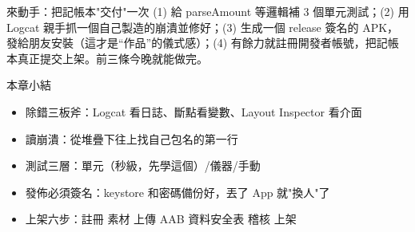 \begin{tcbpractice}{來動手：把記帳本"交付"一次}
(1) 給 parseAmount 等邏輯補 3 個單元測試；(2) 用 Logcat 親手抓一個自己製造的崩潰並修好；(3) 生成一個 release 簽名的 APK，發給朋友安裝（這才是“作品”的儀式感）；(4) 有餘力就註冊開發者帳號，把記帳本真正提交上架。前三條今晚就能做完。

\end{tcbpractice}

\begin{tcbsummary}{本章小結}
\begin{itemize}
  \item 除錯三板斧：Logcat 看日誌、斷點看變數、Layout Inspector 看介面
  \item 讀崩潰：從堆疊下往上找自己包名的第一行
  \item 測試三層：單元（秒級，先學這個）/儀器/手動
  \item 發佈必須簽名：keystore 和密碼備份好，丟了 App 就"換人"了
  \item 上架六步：註冊 素材 上傳 AAB 資料安全表 稽核 上架
\end{itemize}

\end{tcbsummary}
